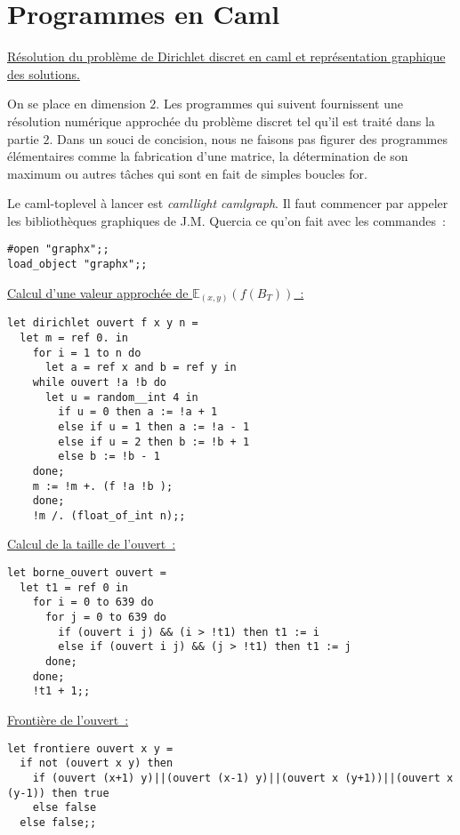 \appendix
\section{Programmes en Caml}
\uline{Résolution du problème de Dirichlet discret en caml et représentation graphique des solutions.}\par
On se place en dimension $2$. Les programmes qui suivent fournissent une résolution numérique approchée du problème
discret tel qu'il est traité dans la partie $2$. Dans un souci de concision, nous ne faisons pas figurer des programmes
élémentaires comme la fabrication d'une matrice, la détermination de son maximum ou autres tâches qui sont
en fait de simples boucles for.\par
Le caml-toplevel à lancer est \textit{camllight camlgraph}.
Il faut commencer par appeler les bibliothèques graphiques de J.M. Quercia ce qu'on fait avec les commandes~:\par
{\begin{verbatim}
#open "graphx";;
load_object "graphx";;
\end{verbatim}}
\uline{Calcul d'une valeur approchée de $\mathbb{E}_{(x,y)}(f(B_T))$~:}\par
{\begin{verbatim}
let dirichlet ouvert f x y n =
  let m = ref 0. in
    for i = 1 to n do
      let a = ref x and b = ref y in
	while ouvert !a !b do
	  let u = random__int 4 in
	    if u = 0 then a := !a + 1
	    else if u = 1 then a := !a - 1
	    else if u = 2 then b := !b + 1
	    else b := !b - 1
	done;
	m := !m +. (f !a !b );
    done;
    !m /. (float_of_int n);;
\end{verbatim}}
\uline{Calcul de la taille de l'ouvert~:}\par
{\begin{verbatim}
let borne_ouvert ouvert =
  let t1 = ref 0 in
    for i = 0 to 639 do
      for j = 0 to 639 do
        if (ouvert i j) && (i > !t1) then t1 := i
        else if (ouvert i j) && (j > !t1) then t1 := j
      done;
    done;
    !t1 + 1;;
\end{verbatim}}

\uline{Frontière de l'ouvert~:}\par
{\begin{verbatim}
let frontiere ouvert x y =
  if not (ouvert x y) then
    if (ouvert (x+1) y)||(ouvert (x-1) y)||(ouvert x (y+1))||(ouvert x (y-1)) then true
    else false
  else false;;
\end{verbatim}}

